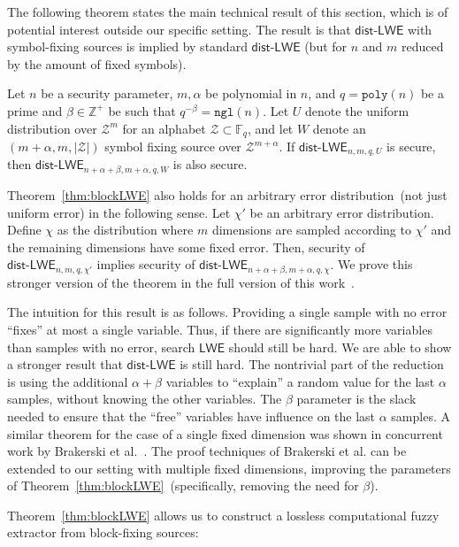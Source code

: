 \documentclass{llncs}
\newcommand{\thref}[1]{\mbox{Theorem~\ref{#1}}}
\newcommand{\class}[1]{{\ensuremath{\mathsf{#1}}}}
\newcommand{\Fq}{\ensuremath{\mathbb{F}_q}}
\newcommand{\poly}{\ensuremath{\mathtt{poly}}\xspace}
\newcommand{\ngl}{\ensuremath{\mathtt{ngl}}\xspace}
\newcommand{\LWE}{\class{LWE}}
\newcommand{\distLWE}{\ensuremath{\class{dist\mbox{-}LWE}}}
\begin{document}
The following theorem states the main technical result of this section, which is of potential interest outside our specific setting. The result is that $\distLWE$ with symbol-fixing sources is implied by standard $\distLWE$ (but for $n$ and $m$ reduced by the amount of fixed symbols).  
\begin{theorem}
\label{thm:blockLWE}
Let $n$ be a security parameter, $m, \alpha$ be polynomial in $n$, and $q=\poly(n)$ be a prime and $\beta\in\mathbb{Z^+}$ be such that $q^{-\beta} = \ngl(n)$. 
Let $U$ denote the uniform distribution over $\mathcal{Z}^m$ for an alphabet $\mathcal{Z}\subset \Fq$, and let $W$ denote an $(m+\alpha, m, |\mathcal{Z}|)$ symbol fixing source over $\mathcal{Z}^{m+\alpha}$.
If $\distLWE_{n, m,q, U}$ is secure, then $\distLWE_{n+\alpha+\beta, m+\alpha, q, W}$ is also secure.
\end{theorem}

\thref{thm:blockLWE} also holds for an arbitrary error distribution~(not just uniform error) in the following sense.  Let $\chi'$ be an arbitrary error distribution.  Define $\chi$ as the distribution where $m$ dimensions are sampled according to $\chi'$ and the remaining dimensions have some fixed error.  Then, security of $\distLWE_{n, m, q, \chi'}$ implies security of $\distLWE_{n+\alpha+ \beta, m+\alpha, q, \chi}$.  We prove this stronger version of the theorem in the full version of this work~\cite{fullerMengReyzin2013}.

The intuition for this result is as follows.  Providing a single sample with no error ``fixes'' at most a single variable.  Thus, if there are significantly more variables than samples with no error,  search $\LWE$ should still be hard.  We are able to show a stronger result that $\distLWE$ is still hard.  The nontrivial part of the reduction is using the additional $\alpha+ \beta$ variables  to ``explain'' a random value for the last $\alpha$ samples, without knowing the other variables.  The $\beta$ parameter is the slack needed to ensure that the ``free'' variables have influence on the last $\alpha$ samples.  A similar theorem for the case of a single fixed dimension was shown in concurrent work by Brakerski et al.~\cite[Lemma 4.3]{brakerski2013classical}.  The proof techniques of Brakerski et al. can be extended to our setting with multiple fixed dimensions, improving the parameters of \thref{thm:blockLWE}~(specifically, removing the need for $\beta$).

\thref{thm:blockLWE} allows us to construct a lossless computational fuzzy extractor from block-fixing sources: 
\end{document}
